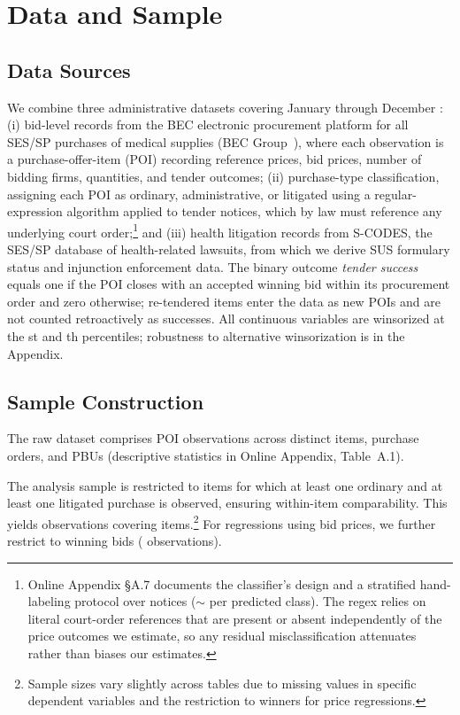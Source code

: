 \section{Data and Sample}
\label{sec:data}

\subsection{Data Sources}

We combine three administrative datasets covering January \BPsampleStartYear{} through December \BPsampleEndYear: (i) bid-level records from the BEC electronic procurement platform for all SES/SP purchases of medical supplies (BEC Group~\BPbecGroup), where each observation is a purchase-offer-item (POI) recording reference prices, bid prices, number of bidding firms, quantities, and tender outcomes; (ii) purchase-type classification, assigning each POI as ordinary, administrative, or litigated using a regular-expression algorithm applied to tender notices, which by law must reference any underlying court order;\footnote{Online Appendix \S A.7 documents the classifier's design and a stratified hand-labeling protocol over \BPregexNotices{} notices (\(\sim\)\BPregexPerClass{} per predicted class). The regex relies on literal court-order references that are present or absent independently of the price outcomes we estimate, so any residual misclassification attenuates rather than biases our estimates.} and (iii) health litigation records from S-CODES, the SES/SP database of health-related lawsuits, from which we derive SUS formulary status and injunction enforcement data. The binary outcome \emph{tender success} equals one if the POI closes with an accepted winning bid within its procurement order and zero otherwise; re-tendered items enter the data as new POIs and are not counted retroactively as successes. All continuous variables are winsorized at the \BPwinsorLow{}st and \BPwinsorHigh{}th percentiles; robustness to alternative winsorization is in the Appendix.

\subsection{Sample Construction}

The raw dataset comprises \BPnPOIfull{} POI observations across \BPnItemsFull{} distinct items, \BPnOrdersFull{} purchase orders, and \BPnPBUsObserved{} PBUs (descriptive statistics in Online Appendix, Table~A.1).

The analysis sample is restricted to items for which at least one ordinary and at least one litigated purchase is observed, ensuring within-item comparability. This yields \BPnAnalysisSample{} observations covering \BPnItemsAnalysis{} items.\footnote{Sample sizes vary slightly across tables due to missing values in specific dependent variables and the restriction to winners for price regressions.} For regressions using bid prices, we further restrict to winning bids (\BPnWinners{} observations).

